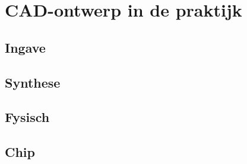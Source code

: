 \section{CAD-ontwerp in de praktijk}
\subsection{Ingave}
\subsection{Synthese}
\subsection{Fysisch}
\subsection{Chip}